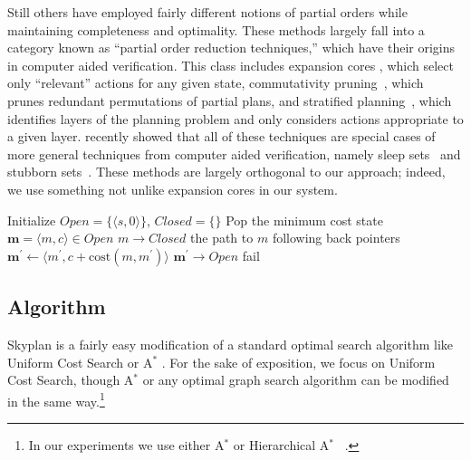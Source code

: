 \documentclass[letterpaper]{article}
\theoremstyle{plain} \newtheorem{theorem}{Theorem} \newtheorem{proposition}{Proposition} \newtheorem{lemma}{Lemma}
\theoremstyle{definition} \newtheorem{definition}{Definition} \newtheorem{conjecture}{Conjecture} \newtheorem*{example}{Example}
\theoremstyle{remark} \newtheorem*{remark}{Remark} \newtheorem*{note}{Note} \newtheorem{case}{Case}
\newcommand{\Astar}{A$^*$ }
\begin{document}
Still others have employed fairly different notions of partial
orders while maintaining completeness and optimality. These methods
largely fall into a category known as ``partial order reduction
techniques,'' which have their origins in computer aided verification.
This class includes expansion cores \citep{chen09completeness,
xu11theory}, which select only ``relevant'' actions for any given
state, commutativity pruning~\citep{geffner2000admissible}, which
prunes redundant permutations of partial plans, and stratified
planning~\citep{chen2009stratified}, which identifies layers of the
planning problem and only considers actions appropriate to a given
layer. \citet{wehrle2012partial} recently showed that all of these
techniques are special cases of more general techniques from computer
aided verification, namely sleep sets~\citep{godefroid96partial}
and stubborn sets~\citep{valmari92stubborn}. These methods are
largely orthogonal to our approach; indeed, we use something not
unlike expansion cores in our system.



\begin{algorithm}[t!]
  \begin{algorithmic}[1]
    \State Initialize $\textit{Open}=\{\langle s,0\rangle\}$, $\textit{Closed}=\{\}$
    \State Pop the minimum cost state $\mathbf{m} = \langle m,c\rangle\in \textit{Open}$
    \State $m\rightarrow \textit{Closed}$
        \State \Return the path to $m$ following back pointers
      \EndIf
        \State $\mathbf{m^\prime} \gets \langle m^\prime,c+\mathrm{cost}(m,m^\prime)\rangle$
        \State $\mathbf{m^\prime} \rightarrow \textit{Open}$
        \EndFor
      \EndIf
    \EndWhile
    \State fail
  \EndProcedure
  \end{algorithmic}
\caption{A version of Skyplan based on uniform cost search.  }
\label{alg:skyplan}
\end{algorithm}

\subsection{Algorithm}

Skyplan is a fairly easy modification of a standard
optimal search algorithm like Uniform Cost Search or \Astar. For
the sake of exposition, we focus on Uniform Cost Search, though
\Astar or any optimal graph search algorithm can be modified in the
same way.\footnote{In our experiments we use either \Astar or
Hierarchical \Astar~\citep{holte1996hierarchical}.}
\end{document}

